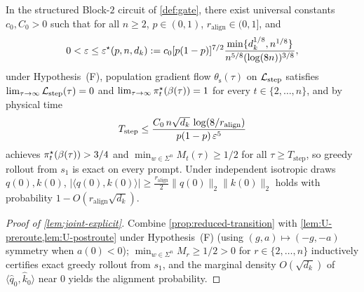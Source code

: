 \begin{lemma}
\label{lem:joint-explicit}
In the structured Block-$2$ circuit of \cref{def:gate}, there exist universal constants $c_0, C_0 > 0$ such that for all $n \ge 2$, $p \in (0,1)$, $r_{\mathrm{align}} \in (0,1]$, and
\begin{equation}
  0 < \varepsilon \le \varepsilon^\star(p, n, d_k) := c_0[p(1-p)]^{7/2}\frac{\min\{d_k^{1/8}, n^{1/8}\}}{n^{5/8}(\log(8n))^{3/8}},
  \label{eq:eps-star}
\end{equation}
under Hypothesis~(F), population gradient flow $\theta_{\mathrm s}(\tau)$ on $\mathcal L_{\mathrm{step}}$ satisfies $\lim_{\tau\to\infty}\mathcal L_{\mathrm{step}}(\tau) = 0$ and $\lim_{\tau\to\infty}\pi_t^\star(\beta(\tau)) = 1$ for every $t \in \{2,\ldots,n\}$, and by physical time
\begin{equation}
  T_{\mathrm{step}} \le \frac{C_0\,n\sqrt{d_k}\,\log(8/r_{\mathrm{align}})}{p(1-p)\,\varepsilon^5}
  \label{eq:joint-time}
\end{equation}
achieves $\pi_t^\star(\beta(\tau)) > 3/4$ and $\min_{w\in\Sigma^n} M_t(\tau) \ge 1/2$ for all $\tau \ge T_{\mathrm{step}}$, so greedy rollout from $s_1$ is exact on every prompt. Under independent isotropic draws $q(0), k(0)$, $\lvert\langle q(0),k(0)\rangle\rvert \ge \tfrac{r_{\mathrm{align}}}{2}\|q(0)\|_2\|k(0)\|_2$ holds with probability $1 - O(r_{\mathrm{align}}\sqrt{d_k})$.
\end{lemma}
\begin{proof}[Proof of \cref{lem:joint-explicit}]
Combine \cref{prop:reduced-transition} with \cref{lem:U-preroute,lem:U-postroute} under Hypothesis~(F) (using $(g,a) \mapsto (-g,-a)$ symmetry when $a(0) < 0$); $\min_{w\in\Sigma^n} M_r \ge 1/2 > 0$ for $r \in \{2,\ldots,n\}$ inductively certifies exact greedy rollout from $s_1$, and the marginal density $O(\sqrt{d_k})$ of $\langle\hat q_0, \hat k_0\rangle$ near $0$ yields the alignment probability.
\end{proof}

